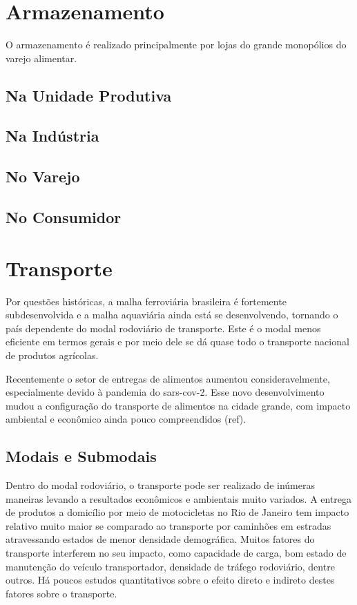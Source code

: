 \documentclass[]{article}
\begin{document}
	\section{Armazenamento}
		O armazenamento é realizado principalmente por lojas do grande monopólios do varejo alimentar.
		
	\subsection{Na Unidade Produtiva}
	
	\subsection{Na Indústria}
	
	\subsection{No Varejo}
	\subsection{No Consumidor}
		
	\section{Transporte}
		Por questões históricas, a malha ferroviária brasileira é fortemente subdesenvolvida e a malha aquaviária ainda está se desenvolvendo, tornando o país dependente do modal rodoviário de transporte. Este é o modal menos eficiente em termos gerais e por meio dele se dá quase todo o transporte nacional de produtos agrícolas. 

Recentemente o setor de entregas de alimentos aumentou consideravelmente, especialmente devido à pandemia do sars-cov-2. Esse novo desenvolvimento mudou a configuração do transporte de alimentos na cidade grande, com impacto ambiental e econômico ainda pouco compreendidos (ref). 

	\subsection{Modais e Submodais}

		Dentro do modal rodoviário, o transporte pode ser realizado de inúmeras maneiras levando a resultados econômicos e ambientais muito variados. A entrega de produtos a domicílio por meio de motocicletas no Rio de Janeiro tem impacto relativo muito maior se comparado ao transporte por caminhões em estradas atravessando estados de menor densidade demográfica. Muitos fatores do transporte interferem no seu impacto, como capacidade de carga, bom estado de manutenção do veículo transportador, densidade de tráfego rodoviário, dentre outros. Há poucos estudos quantitativos sobre o efeito direto e indireto destes fatores sobre o transporte.
		
\end{document}
